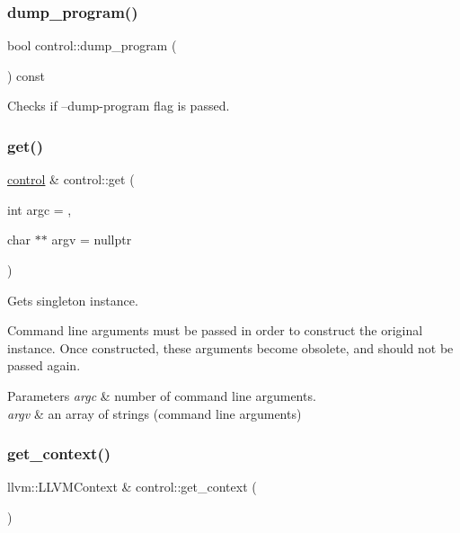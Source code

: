 \subsubsection{\texorpdfstring{dump\+\_\+program()}{dump\_program()}}
{\footnotesize\ttfamily bool control\+::dump\+\_\+program (\begin{DoxyParamCaption}{ }\end{DoxyParamCaption}) const}

Checks if --dump-\/program flag is passed. \mbox{\label{classjawe_1_1control_ad702fe6d2f641c518d12665278df20a3}} 
\subsubsection{\texorpdfstring{get()}{get()}}
{\footnotesize\ttfamily \hyperlink{classjawe_1_1control}{control} \& control\+::get (\begin{DoxyParamCaption}\item[{int}]{argc = {},  }\item[{char $\ast$$\ast$}]{argv = {\ttfamily nullptr} }\end{DoxyParamCaption})\hspace{0.3cm}{\ttfamily [static]}}



Gets singleton instance. 

Command line arguments must be passed in order to construct the original instance. Once constructed, these arguments become obsolete, and should not be passed again. 
\begin{DoxyParams}{Parameters}
{\em argc} & number of command line arguments. \\
\hline
{\em argv} & an array of strings (command line arguments) \\
\hline
\end{DoxyParams}
\mbox{\label{classjawe_1_1control_a77eced5b2483f1d9b3f95d8137f2e8b6}} 
\subsubsection{\texorpdfstring{get\+\_\+context()}{get\_context()}}
{\footnotesize\ttfamily llvm\+::\+L\+L\+V\+M\+Context \& control\+::get\+\_\+context (\begin{DoxyParamCaption}{ }\end{DoxyParamCaption})}

